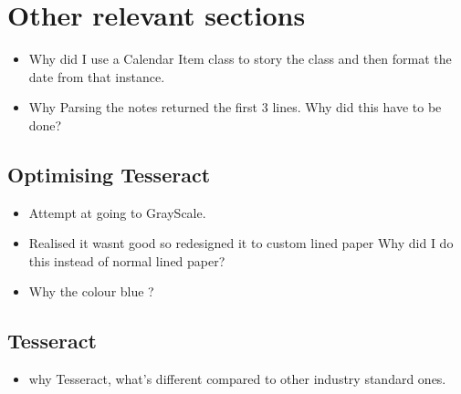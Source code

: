 \section{Other relevant sections}
\begin{itemize}
  \item Why did I use a Calendar Item class to story the class and then format the date from that instance.
  \item Why Parsing the notes returned the first 3 lines. Why did this have to be done?
  
\end{itemize}
\subsection{Optimising Tesseract}
\begin{itemize}
  \item Attempt at going to GrayScale.
  \item Realised it wasnt good so redesigned it to custom lined paper Why did I do this instead of normal lined paper?
  \item Why the colour blue ?
\end{itemize}

\subsection{Tesseract}
\begin{itemize}
  \item why Tesseract, what's different compared to other industry standard ones.
\end{itemize}
